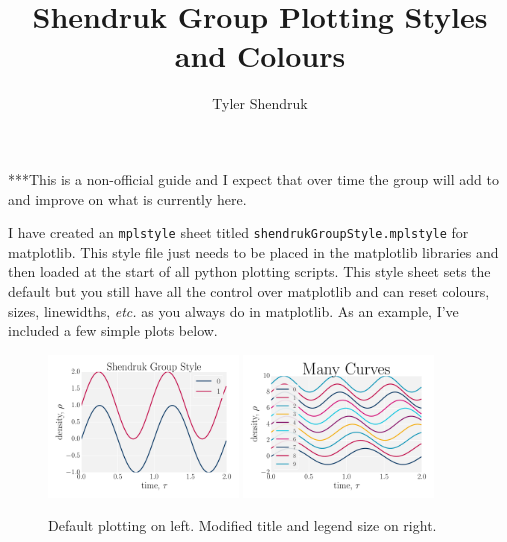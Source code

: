 \documentclass[10pt,a4paper]{article}
\author{Tyler Shendruk}
\title{Shendruk Group Plotting Styles and Colours}
\begin{document}
\maketitle

***This is a non-official guide and I expect that over time the group will add to and improve on what is currently here. 

I have created an \texttt{mplstyle} sheet titled \texttt{shendrukGroupStyle.mplstyle} for matplotlib. 
This style file just needs to be placed in the matplotlib libraries and then loaded at the start of all python plotting scripts. 
This style sheet sets the default but you still have all the control over matplotlib and can reset colours, sizes, linewidths, \textit{etc.} as you always do in matplotlib. 
As an example, I've included a few simple plots below. 
\begin{figure}[h]
  \centering
  \includegraphics[width=0.45\textwidth]{linestyle.pdf}
  \includegraphics[width=0.45\textwidth]{manylines.pdf}
  \caption{Default plotting on left. Modified title and legend size on right.}
\end{figure}
\end{document}

